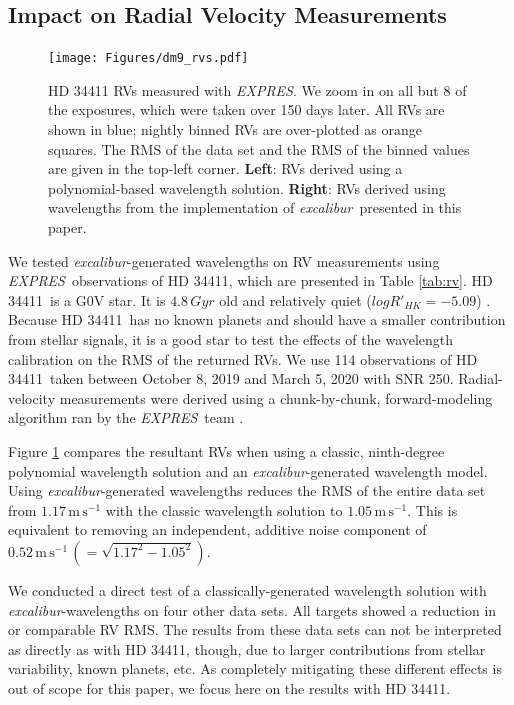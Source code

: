 \documentclass[twocolumn,table,xcolor,trackchanges]{aastex63}
\newcommand{\project}[1]{\textsl{#1}}
\newcommand{\name}{\project{excalibur}}
\newcommand{\acronym}[1]{{\small{#1}}}
\newcommand{\expres}{\project{\acronym{EXPRES}}}
\newcommand{\target}{HD 34411}
\newcommand{\mps}{\mathrm{m\,s^{-1}}}
\begin{document}
\subsection{Impact on Radial Velocity Measurements}\label{sec:test-rv}

\begin{figure}[t]
\centering
\texttt{[image: Figures/dm9\_rvs.pdf]}
\caption{HD 34411 RVs measured with \expres.  We zoom in on all but 8 of the exposures, which were taken over 150 days later.  All RVs are shown in blue; nightly binned RVs are over-plotted as orange squares.  The RMS of the data set and the RMS of the binned values are given in the top-left corner.  \textbf{Left}: RVs derived using a polynomial-based wavelength solution.  \textbf{Right}: RVs derived using wavelengths from the implementation of \name\ presented in this paper.}
\label{fig:rvs}
\end{figure}

We tested \name -generated wavelengths on RV measurements using \expres\ observations of \target, which are presented in Table \ref{tab:rv}.  \target\ is a G0V star.  It is $4.8\, Gyr$ old and relatively quiet ($log R'_{HK} = -5.09$) \citep{brewer2016}.  Because \target\ has no known planets and should have a smaller contribution from stellar signals, it is a good star to test the effects of the wavelength calibration on the RMS of the returned RVs.  We use 114 observations of \target\ taken between October 8, 2019 and March 5, 2020 with SNR 250.  Radial-velocity measurements were derived using a chunk-by-chunk, forward-modeling algorithm ran by the \expres\ team \citep{petersburg2020}.

Figure \ref{fig:rvs} compares the resultant RVs when using a classic, ninth-degree polynomial wavelength solution and an \name -generated wavelength model.  Using \name -generated wavelengths reduces the RMS of the entire data set from $1.17\, \mps$ with the classic wavelength solution to $1.05\, \mps$.  This is equivalent to removing an independent, additive noise component of $0.52\, \mps \,(=\sqrt{1.17^2-1.05^2})$.

We conducted a direct test of a classically-generated wavelength solution with \name -wavelengths on four other data sets.  All targets showed a reduction in or comparable RV RMS.  The results from these data sets can not be interpreted as directly as with \target, though, due to larger contributions from stellar variability, known planets, etc.  As completely mitigating these different effects is out of scope for this paper, we focus here on the results with \target.
\end{document}
